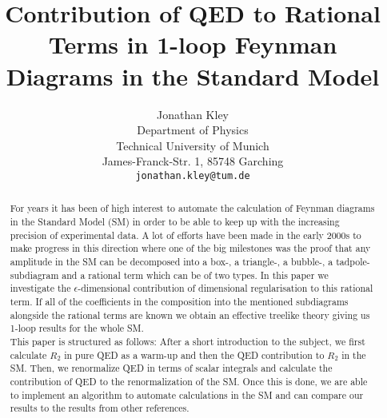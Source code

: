 \documentclass{article}
\title{Contribution of QED to Rational Terms in 1-loop Feynman Diagrams in the Standard Model}
\author{
  Jonathan Kley \\
  Department of Physics\\
  Technical University of Munich\\
  James-Franck-Str. 1, 85748 Garching \\
  \texttt{jonathan.kley@tum.de} \\
}
\numberwithin{equation}{section} %
\begin{document}
\maketitle

\begin{abstract}
For years it has been of high interest to automate the calculation of Feynman diagrams in the Standard Model (SM) in order to be able to keep up with the increasing precision of experimental data. A lot of efforts have been made in the early 2000s to make progress in this direction where one of the big milestones was the proof that any amplitude in the SM can be decomposed into a box-, a triangle-, a bubble-, a tadpole-subdiagram and a rational term which can be of two types. In this paper we investigate the $\epsilon$-dimensional contribution of dimensional regularisation to this rational term. If all of the coefficients in the composition into the mentioned subdiagrams alongside the rational terms are known we obtain an effective treelike theory giving us 1-loop results for the whole SM. \\
This paper is structured as follows: After a short introduction to the subject, we first calculate $R_2$ in pure QED as a warm-up and then the QED contribution to $R_2$ in the SM. Then, we renormalize QED in terms of scalar integrals and calculate the contribution of QED to the renormalization of the SM. Once this is done, we are able to implement an algorithm to automate calculations in the SM and can compare our results to the results from other references.\end{abstract}



\newpage
\tableofcontents
\newpage








  

\end{document}
